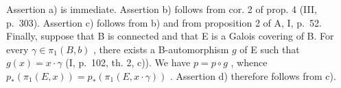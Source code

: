 Assertion a) is immediate. Assertion b) follows from cor. 2 of prop. 4 (III, p.~303). Assertion c) follows from b) and from proposition 2 of A, I, p.~52. Finally, suppose that B is connected and that E is a Galois covering of B. For every \(\gamma \in \pi_1(B,b)\) , there exists a B-automorphism \(g\) of E such that \(g(x) = x \cdot \gamma\) (I, p.~102, th. 2, c)). We have \(p = p \circ g\) , whence \(p_*(\pi_1(E,x)) = p_*(\pi_1(E,x \cdot \gamma))\) . Assertion d) therefore follows from c).
\relax{}
